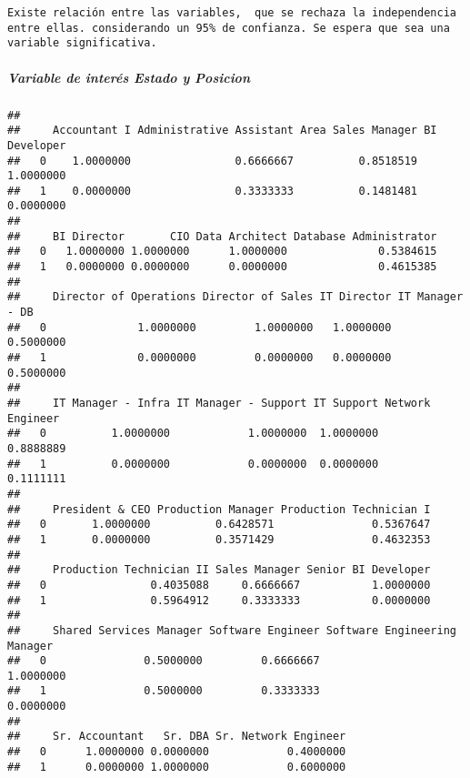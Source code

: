 \documentclass[
]{article}
\newenvironment{Shaded}{\begin{snugshade}}{\end{snugshade}}
\newcommand{\DecValTok}[1]{\textcolor[rgb]{0.00,0.00,0.81}{#1}}
\newcommand{\FunctionTok}[1]{\textcolor[rgb]{0.00,0.00,0.00}{#1}}
\newcommand{\NormalTok}[1]{#1}
\newcommand{\SpecialCharTok}[1]{\textcolor[rgb]{0.00,0.00,0.00}{#1}}
\begin{document}
\begin{verbatim}
Existe relación entre las variables,  que se rechaza la independencia entre ellas. considerando un 95% de confianza. Se espera que sea una variable significativa.
\end{verbatim}

\hypertarget{variable-de-interuxe9s-estado-y-posicion}{%
\subparagraph{Variable de interés Estado y
Posicion}\label{variable-de-interuxe9s-estado-y-posicion}}

\begin{Shaded}
\end{Shaded}

\begin{verbatim}
##    
##     Accountant I Administrative Assistant Area Sales Manager BI Developer
##   0    1.0000000                0.6666667          0.8518519    1.0000000
##   1    0.0000000                0.3333333          0.1481481    0.0000000
##    
##     BI Director       CIO Data Architect Database Administrator
##   0   1.0000000 1.0000000      1.0000000              0.5384615
##   1   0.0000000 0.0000000      0.0000000              0.4615385
##    
##     Director of Operations Director of Sales IT Director IT Manager - DB
##   0              1.0000000         1.0000000   1.0000000       0.5000000
##   1              0.0000000         0.0000000   0.0000000       0.5000000
##    
##     IT Manager - Infra IT Manager - Support IT Support Network Engineer
##   0          1.0000000            1.0000000  1.0000000        0.8888889
##   1          0.0000000            0.0000000  0.0000000        0.1111111
##    
##     President & CEO Production Manager Production Technician I
##   0       1.0000000          0.6428571               0.5367647
##   1       0.0000000          0.3571429               0.4632353
##    
##     Production Technician II Sales Manager Senior BI Developer
##   0                0.4035088     0.6666667           1.0000000
##   1                0.5964912     0.3333333           0.0000000
##    
##     Shared Services Manager Software Engineer Software Engineering Manager
##   0               0.5000000         0.6666667                    1.0000000
##   1               0.5000000         0.3333333                    0.0000000
##    
##     Sr. Accountant   Sr. DBA Sr. Network Engineer
##   0      1.0000000 0.0000000            0.4000000
##   1      0.0000000 1.0000000            0.6000000
\end{verbatim}
\end{document}
